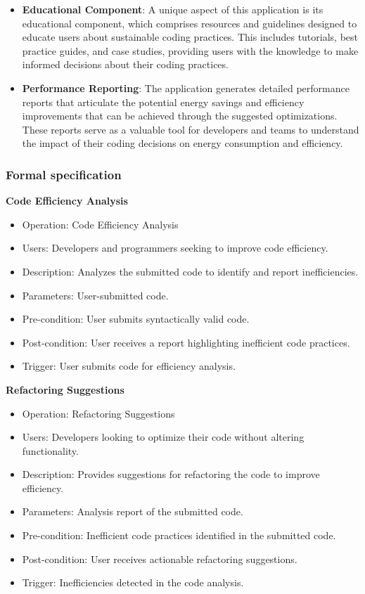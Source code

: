 \documentclass[conference,compsoc]{IEEEtran}
\begin{document}
\begin{itemize}
    \item \textbf{Educational Component}: A unique aspect of this application is its educational component, which comprises resources and guidelines designed to educate users about sustainable coding practices. This includes tutorials, best practice guides, and case studies, providing users with the knowledge to make informed decisions about their coding practices.
    
    \item \textbf{Performance Reporting}: The application generates detailed performance reports that articulate the potential energy savings and efficiency improvements that can be achieved through the suggested optimizations. These reports serve as a valuable tool for developers and teams to understand the impact of their coding decisions on energy consumption and efficiency.
    \end{itemize}

\subsubsection{Formal specification}
\textbf{Code Efficiency Analysis}
\begin{itemize}
    \item Operation: Code Efficiency Analysis
    \item Users: Developers and programmers seeking to improve code efficiency.
    \item Description: Analyzes the submitted code to identify and report inefficiencies.
    \item Parameters: User-submitted code.
    \item Pre-condition: User submits syntactically valid code.
    \item Post-condition: User receives a report highlighting inefficient code practices.
    \item Trigger: User submits code for efficiency analysis.
\end{itemize}

\textbf{Refactoring Suggestions}
\begin{itemize}
    \item Operation: Refactoring Suggestions
    \item Users: Developers looking to optimize their code without altering functionality.
    \item Description: Provides suggestions for refactoring the code to improve efficiency.
    \item Parameters: Analysis report of the submitted code.
    \item Pre-condition: Inefficient code practices identified in the submitted code.
    \item Post-condition: User receives actionable refactoring suggestions.
    \item Trigger: Inefficiencies detected in the code analysis.
\end{itemize}
\end{document}
